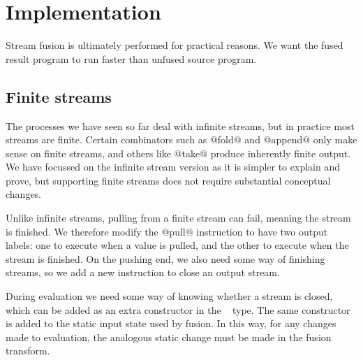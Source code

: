 

\eject
\section{Implementation}
\label{s:Evaluation}

Stream fusion is ultimately performed for practical reasons. We want the fused result program to run faster than unfused source program.

\subsection{Finite streams}
\label{s:Finite}

The processes we have seen so far deal with infinite streams, but in practice most streams are finite. Certain combinators such as @fold@ and @append@ only make sense on finite streams, and others like @take@ produce inherently finite output. We have focussed on the infinite stream version as it is simpler to explain and prove, but supporting finite streams does not require substantial conceptual changes.

Unlike infinite streams, pulling from a finite stream can fail, meaning the stream is finished. We therefore modify the @pull@ instruction to have two output labels: one to execute when a value is pulled, and the other to execute when the stream is finished. On the pushing end, we also need some way of finishing streams, so we add a new instruction to close an output stream.

During evaluation we need some way of knowing whether a stream is closed, which can be added as an extra constructor in the \InputState~ type. The same constructor is added to the static input state used by fusion. In this way, for any changes made to evaluation, the analogous static change must be made in the fusion transform.



